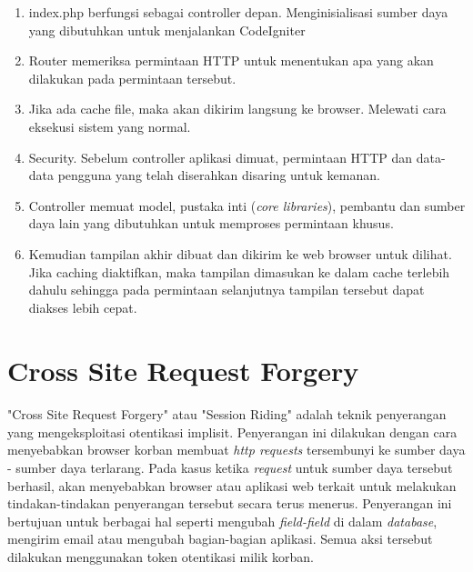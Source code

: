 \begin{enumerate}
		\item index.php berfungsi sebagai controller depan. Menginisialisasi sumber daya yang dibutuhkan untuk menjalankan CodeIgniter
		\item Router memeriksa permintaan HTTP untuk menentukan apa yang akan dilakukan pada permintaan tersebut.
		\item Jika ada cache file, maka akan dikirim langsung ke browser. Melewati cara eksekusi sistem yang normal.
		\item Security. Sebelum controller aplikasi dimuat, permintaan HTTP dan data-data pengguna yang telah diserahkan disaring untuk kemanan.
		\item Controller memuat model, pustaka inti (\textit{core libraries}), pembantu dan sumber daya lain yang dibutuhkan untuk memproses permintaan khusus.
		\item Kemudian tampilan akhir dibuat dan dikirim ke web browser untuk dilihat. Jika caching diaktifkan, maka tampilan dimasukan ke dalam cache terlebih dahulu sehingga pada permintaan selanjutnya tampilan tersebut dapat diakses lebih cepat.
	\end{enumerate}


\section{Cross Site Request Forgery}
\paragraph{}"Cross Site Request Forgery" atau "Session Riding" adalah teknik penyerangan yang mengeksploitasi otentikasi implisit. Penyerangan ini dilakukan dengan cara menyebabkan browser korban membuat \textit{http requests} tersembunyi ke sumber daya - sumber daya terlarang. Pada kasus ketika \textit{request} untuk sumber daya tersebut berhasil, akan menyebabkan browser atau aplikasi web terkait untuk melakukan tindakan-tindakan penyerangan tersebut secara terus menerus. Penyerangan ini bertujuan untuk berbagai hal seperti mengubah \textit{field-field} di dalam \textit{database}, mengirim email atau mengubah bagian-bagian aplikasi. Semua aksi tersebut dilakukan menggunakan token otentikasi milik korban. 

